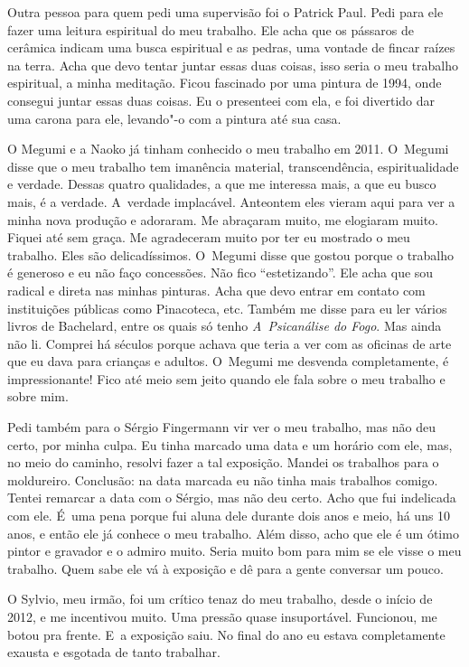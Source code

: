 Outra pessoa para quem pedi uma supervisão foi o Patrick Paul. Pedi para
ele fazer uma leitura espiritual do meu trabalho. Ele acha que os
pássaros de cerâmica indicam uma busca espiritual e as pedras, uma
vontade de fincar raízes na terra. Acha que devo tentar juntar essas
duas coisas, isso seria o meu trabalho espiritual, a minha meditação.
Ficou fascinado por uma pintura de 1994, onde consegui juntar essas duas
coisas. Eu o presenteei com ela, e foi divertido dar uma carona para
ele, levando"-o com a pintura até sua casa.

O Megumi e a Naoko já tinham conhecido o meu trabalho em 2011. O~Megumi
disse que o meu trabalho tem imanência material, transcendência,
espiritualidade e verdade. Dessas quatro qualidades, a que me interessa
mais, a que eu busco mais, é a verdade. A~verdade implacável. Anteontem
eles vieram aqui para ver a minha nova produção e adoraram. Me abraçaram
muito, me elogiaram muito. Fiquei até sem graça. Me agradeceram muito
por ter eu mostrado o meu trabalho. Eles são delicadíssimos. O~Megumi
disse que gostou porque o trabalho é generoso e eu não faço concessões.
Não fico ``estetizando''. Ele acha que sou radical e direta nas minhas
pinturas. Acha que devo entrar em contato com instituições públicas como
Pinacoteca,  etc. Também me disse para eu ler vários livros de
Bachelard, entre os quais só tenho \emph{A~Psicanálise do Fogo}. Mas
ainda não li. Comprei há séculos porque achava que teria a ver com as
oficinas de arte que eu dava para crianças e adultos. O~Megumi me
desvenda completamente, é impressionante! Fico até meio sem jeito quando
ele fala sobre o meu trabalho e sobre mim.

Pedi também para o Sérgio Fingermann vir ver o meu trabalho, mas não deu
certo, por minha culpa. Eu tinha marcado uma data e um horário com ele,
mas, no meio do caminho, resolvi fazer a tal exposição. Mandei os
trabalhos para o moldureiro. Conclusão: na data marcada eu não tinha
mais trabalhos comigo. Tentei remarcar a data com o Sérgio, mas não deu
certo. Acho que fui indelicada com ele. É~uma pena porque fui aluna dele
durante dois anos e meio, há uns 10 anos, e então ele já conhece o meu
trabalho. Além disso, acho que ele é um ótimo pintor e gravador e o
admiro muito. Seria muito bom para mim se ele visse o meu trabalho. Quem
sabe ele vá à exposição e dê para a gente conversar um pouco.

O Sylvio, meu irmão, foi um crítico tenaz do meu trabalho, desde o
início de 2012, e me incentivou muito. Uma pressão quase insuportável.
Funcionou, me botou pra frente. E~a exposição saiu. No final do ano eu
estava completamente exausta e esgotada de tanto trabalhar.

